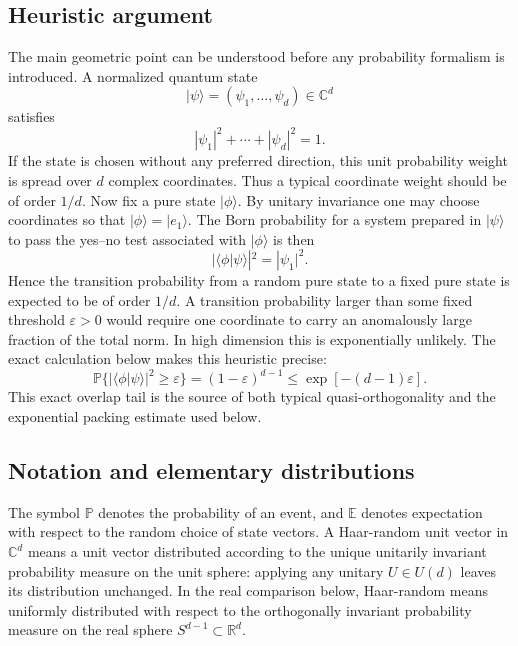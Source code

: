 \documentclass[aps,pra,reprint,superscriptaddress,nofootinbib,longbibliography]{revtex4-2}
\newcommand{\ket}[1]{| #1 \rangle}
\newcommand{\eps}{\varepsilon}
\newcommand{\E}{\mathbb{E}}
\newcommand{\PP}{\mathbb{P}}
\begin{document}
\subsection*{Heuristic argument}

The main geometric point can be understood before any probability formalism is
introduced.  A normalized quantum state
\begin{equation}
    \ket{\psi}
    =
    (\psi_1,\ldots,\psi_d)
    \in \mathbb C^d
\end{equation}
satisfies
\begin{equation}
    |\psi_1|^2+\cdots+|\psi_d|^2=1 .
\end{equation}
If the state is chosen without any preferred direction, this unit probability
weight is spread over $d$ complex coordinates.  Thus a typical coordinate
weight should be of order $1/d$.  Now fix a pure state $\ket{\phi}$.  By
unitary invariance one may choose coordinates so that $\ket{\phi}=\ket{e_1}$.
The Born probability for a system prepared in $\ket{\psi}$ to pass the yes--no
test associated with $\ket{\phi}$ is then
\begin{equation}
    |\langle\phi|\psi\rangle|^2=|\psi_1|^2 .
\end{equation}
Hence the transition probability from a random pure state to a fixed pure state
is expected to be of order $1/d$.  A transition probability larger than some
fixed threshold $\eps>0$ would require one coordinate to carry an anomalously
large fraction of the total norm.  In high dimension this is exponentially
unlikely.  The exact calculation below makes this heuristic precise:
\begin{equation}
    \PP\{ |\langle\phi|\psi\rangle|^2\geq\eps\}
    =
    (1-\eps)^{d-1}
    \leq
    \exp[-(d-1)\eps].
    \label{eq:heuristic-tail}
\end{equation}
This exact overlap tail is the source of both typical quasi-orthogonality and
the exponential packing estimate used below.

\subsection*{Notation and elementary distributions}

The symbol $\PP$ denotes the probability of an event, and $\E$ denotes
expectation with respect to the random choice of state vectors.  A Haar-random
unit vector in $\mathbb C^d$ means a unit vector distributed according to the
unique unitarily invariant probability measure on the unit sphere: applying
any unitary $U\in U(d)$ leaves its distribution unchanged.  In the real
comparison below, Haar-random means uniformly distributed with respect to the
orthogonally invariant probability measure on the real sphere
$S^{d-1}\subset\mathbb R^d$.
\end{document}
